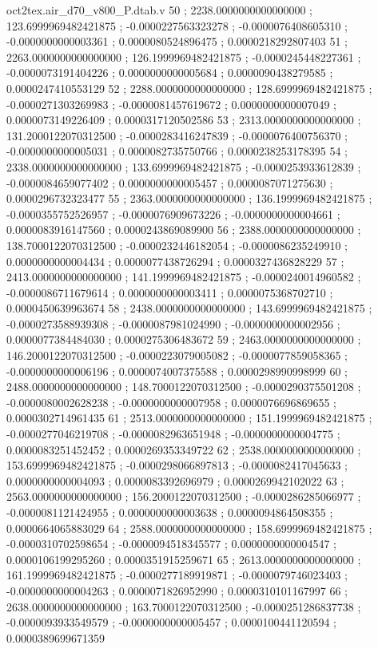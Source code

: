 \begin{filecontents}[overwrite]{oct2tex.air_d70_v800_P.dtab.v}
50 ; 2238.0000000000000000 ; 123.6999969482421875 ; -0.0000227563323278 ; -0.0000076408605310 ; -0.0000000000003361 ; 0.0000080524896475 ; 0.0000218292807403
51 ; 2263.0000000000000000 ; 126.1999969482421875 ; -0.0000245448227361 ; -0.0000073191404226 ; 0.0000000000005684 ; 0.0000090438279585 ; 0.0000247410553129
52 ; 2288.0000000000000000 ; 128.6999969482421875 ; -0.0000271303269983 ; -0.0000081457619672 ; 0.0000000000007049 ; 0.0000073149226409 ; 0.0000317120502586
53 ; 2313.0000000000000000 ; 131.2000122070312500 ; -0.0000283416247839 ; -0.0000076400756370 ; -0.0000000000005031 ; 0.0000082735750766 ; 0.0000238253178395
54 ; 2338.0000000000000000 ; 133.6999969482421875 ; -0.0000253933612839 ; -0.0000084659077402 ; 0.0000000000005457 ; 0.0000087071275630 ; 0.0000296732323477
55 ; 2363.0000000000000000 ; 136.1999969482421875 ; -0.0000355752526957 ; -0.0000076909673226 ; -0.0000000000004661 ; 0.0000083916147560 ; 0.0000243869089900
56 ; 2388.0000000000000000 ; 138.7000122070312500 ; -0.0000232446182054 ; -0.0000086235249910 ; 0.0000000000004434 ; 0.0000077438726294 ; 0.0000327436828229
57 ; 2413.0000000000000000 ; 141.1999969482421875 ; -0.0000240014960582 ; -0.0000086711679614 ; 0.0000000000003411 ; 0.0000075368702710 ; 0.0000450639963674
58 ; 2438.0000000000000000 ; 143.6999969482421875 ; -0.0000273588939308 ; -0.0000087981024990 ; -0.0000000000002956 ; 0.0000077384484030 ; 0.0000275306483672
59 ; 2463.0000000000000000 ; 146.2000122070312500 ; -0.0000223079005082 ; -0.0000077859058365 ; -0.0000000000006196 ; 0.0000074007375588 ; 0.0000298990998999
60 ; 2488.0000000000000000 ; 148.7000122070312500 ; -0.0000290375501208 ; -0.0000080002628238 ; -0.0000000000007958 ; 0.0000076696869655 ; 0.0000302714961435
61 ; 2513.0000000000000000 ; 151.1999969482421875 ; -0.0000277046219708 ; -0.0000082963651948 ; -0.0000000000004775 ; 0.0000083251452452 ; 0.0000269353349722
62 ; 2538.0000000000000000 ; 153.6999969482421875 ; -0.0000298066897813 ; -0.0000082417045633 ; 0.0000000000004093 ; 0.0000083392696979 ; 0.0000269942102022
63 ; 2563.0000000000000000 ; 156.2000122070312500 ; -0.0000286285066977 ; -0.0000081121424955 ; 0.0000000000003638 ; 0.0000094864508355 ; 0.0000664065883029
64 ; 2588.0000000000000000 ; 158.6999969482421875 ; -0.0000310702598654 ; -0.0000094518345577 ; 0.0000000000004547 ; 0.0000106199295260 ; 0.0000351915259671
65 ; 2613.0000000000000000 ; 161.1999969482421875 ; -0.0000277189919871 ; -0.0000079746023403 ; -0.0000000000004263 ; 0.0000071826952990 ; 0.0000310101167997
66 ; 2638.0000000000000000 ; 163.7000122070312500 ; -0.0000251286837738 ; -0.0000093933549579 ; -0.0000000000005457 ; 0.0000100441120594 ; 0.0000389699671359

\end{filecontents}
